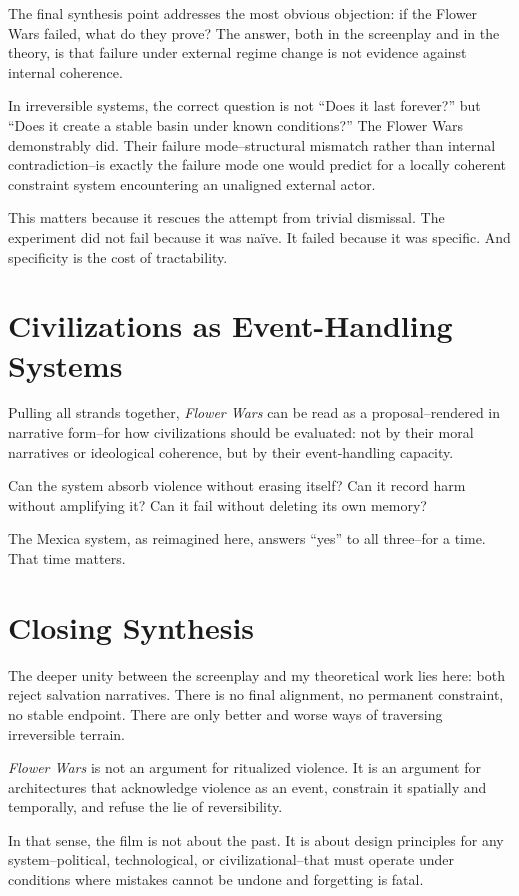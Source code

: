 \documentclass[12pt]{article}
\begin{document}
The final synthesis point addresses the most obvious objection: if the Flower Wars failed, what do they prove? The answer, both in the screenplay and in the theory, is that failure under external regime change is not evidence against internal coherence.

In irreversible systems, the correct question is not ``Does it last forever?'' but ``Does it create a stable basin under known conditions?'' The Flower Wars demonstrably did. Their failure mode--structural mismatch rather than internal contradiction--is exactly the failure mode one would predict for a locally coherent constraint system encountering an unaligned external actor.

This matters because it rescues the attempt from trivial dismissal. The experiment did not fail because it was naïve. It failed because it was specific. And specificity is the cost of tractability.

\section*{Civilizations as Event-Handling Systems}

Pulling all strands together, \textit{Flower Wars} can be read as a proposal--rendered in narrative form--for how civilizations should be evaluated: not by their moral narratives or ideological coherence, but by their event-handling capacity.

Can the system absorb violence without erasing itself?
Can it record harm without amplifying it?
Can it fail without deleting its own memory?

The Mexica system, as reimagined here, answers ``yes'' to all three--for a time. That time matters.

\section*{Closing Synthesis}

The deeper unity between the screenplay and my theoretical work lies here: both reject salvation narratives. There is no final alignment, no permanent constraint, no stable endpoint. There are only better and worse ways of traversing irreversible terrain.

\textit{Flower Wars} is not an argument for ritualized violence. It is an argument for architectures that acknowledge violence as an event, constrain it spatially and temporally, and refuse the lie of reversibility.

In that sense, the film is not about the past. It is about design principles for any system--political, technological, or civilizational--that must operate under conditions where mistakes cannot be undone and forgetting is fatal.
\end{document}
